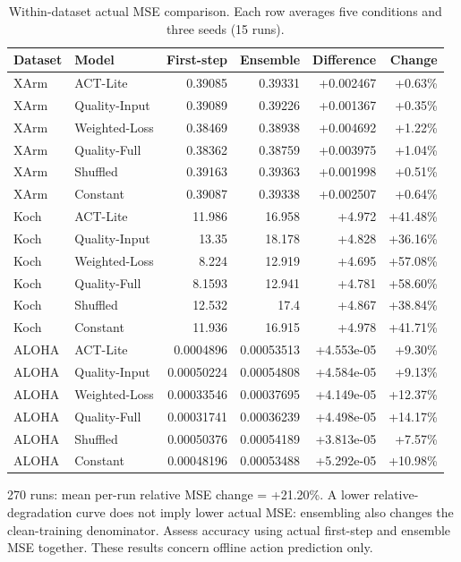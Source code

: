 \documentclass[11pt,a4paper]{article}
\begin{document}
\begin{table}[H]\centering\small\begin{tabularx}{\linewidth}{lYrrrr}\toprule
Dataset & Model & First-step & Ensemble & Difference & Change\\\midrule
XArm & ACT-Lite & 0.39085 & 0.39331 & +0.002467 & +0.63\%\\
XArm & Quality-Input & 0.39089 & 0.39226 & +0.001367 & +0.35\%\\
XArm & Weighted-Loss & 0.38469 & 0.38938 & +0.004692 & +1.22\%\\
XArm & Quality-Full & 0.38362 & 0.38759 & +0.003975 & +1.04\%\\
XArm & Shuffled & 0.39163 & 0.39363 & +0.001998 & +0.51\%\\
XArm & Constant & 0.39087 & 0.39338 & +0.002507 & +0.64\%\\
Koch & ACT-Lite & 11.986 & 16.958 & +4.972 & +41.48\%\\
Koch & Quality-Input & 13.35 & 18.178 & +4.828 & +36.16\%\\
Koch & Weighted-Loss & 8.224 & 12.919 & +4.695 & +57.08\%\\
Koch & Quality-Full & 8.1593 & 12.941 & +4.781 & +58.60\%\\
Koch & Shuffled & 12.532 & 17.4 & +4.867 & +38.84\%\\
Koch & Constant & 11.936 & 16.915 & +4.978 & +41.71\%\\
ALOHA & ACT-Lite & 0.0004896 & 0.00053513 & +4.553e-05 & +9.30\%\\
ALOHA & Quality-Input & 0.00050224 & 0.00054808 & +4.584e-05 & +9.13\%\\
ALOHA & Weighted-Loss & 0.00033546 & 0.00037695 & +4.149e-05 & +12.37\%\\
ALOHA & Quality-Full & 0.00031741 & 0.00036239 & +4.498e-05 & +14.17\%\\
ALOHA & Shuffled & 0.00050376 & 0.00054189 & +3.813e-05 & +7.57\%\\
ALOHA & Constant & 0.00048196 & 0.00053488 & +5.292e-05 & +10.98\%\\
\bottomrule\end{tabularx}\caption{Within-dataset actual MSE comparison. Each row averages five conditions and three seeds (15 runs).}\end{table}
270 runs: mean per-run relative MSE change = +21.20\%. A lower relative-degradation curve does not imply lower actual MSE: ensembling also changes the clean-training denominator. Assess accuracy using actual first-step and ensemble MSE together. These results concern offline action prediction only.
\end{document}

